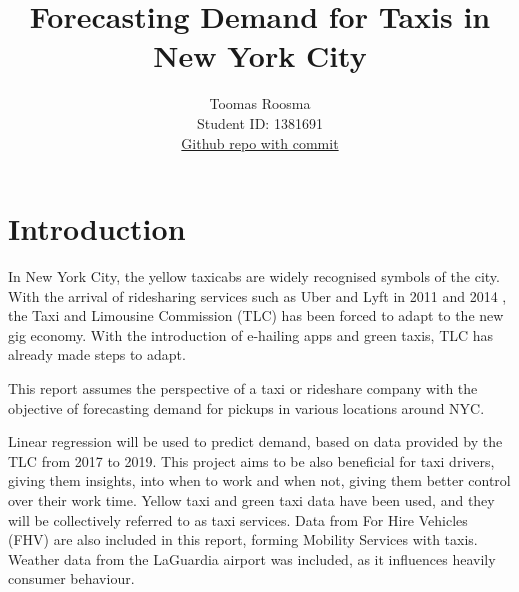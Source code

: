 \documentclass[11pt]{article}
\title{\textbf{Forecasting Demand for Taxis in New York City}}
\author{
Toomas Roosma \\
Student ID: 1381691 \\
\href{https://github.com/MAST30034-Applied-Data-Science/mast30034-project-1-ToomasRo/commit/68eb95dd343f163fd64bdcbf79bc71494db85056}{Github repo with commit}
}
\begin{document}
\maketitle

\section{Introduction}
In  New York City, the yellow taxicabs are widely recognised symbols of the city. 
With the arrival of ridesharing services such as Uber and Lyft in 2011 \cite{uberStartDate} and 2014 \cite{lyftStartDate}, the Taxi and Limousine Commission (TLC) has been forced to adapt to the new gig economy. With the introduction of e-hailing apps and green taxis, TLC has already made steps to adapt. 

This report assumes the perspective of a taxi or rideshare company with the objective of forecasting demand for pickups in various locations around NYC.

Linear regression will be used to predict demand, based on data provided by the TLC from 2017 to 2019. This project aims to be also beneficial for taxi drivers, giving them insights, into when to work and when not, giving them better control over their work time. Yellow taxi and green taxi data have been used, and they will be collectively referred to as taxi services. Data from For Hire Vehicles (FHV) are also included in this report, forming Mobility Services with taxis. Weather data from the LaGuardia airport was included, as it influences heavily consumer behaviour. 

\end{document}
